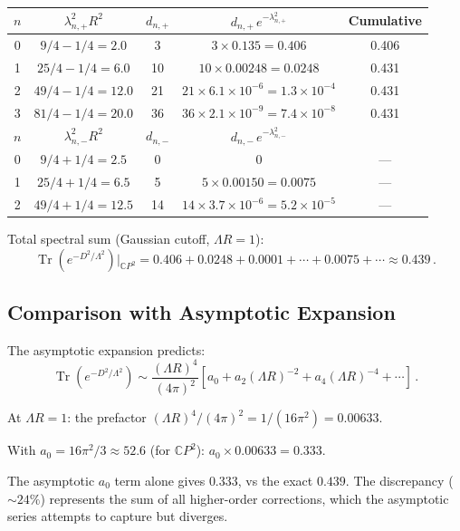 \documentclass[11pt,a4paper]{article}
\newcommand{\Tr}{\operatorname{Tr}}
\newcommand{\CP}{\mathbb{C}P}
\begin{document}
\begin{center}
\begin{longtable}{ccccc}
\toprule
$n$ & $\lambda_{n,+}^2 R^2$ & $d_{n,+}$ & $d_{n,+}\,e^{-\lambda_{n,+}^2}$ & Cumulative \\
\midrule
0 & $9/4 - 1/4 = 2.0$ & 3 & $3 \times 0.135 = 0.406$ & 0.406 \\
1 & $25/4 - 1/4 = 6.0$ & 10 & $10 \times 0.00248 = 0.0248$ & 0.431 \\
2 & $49/4 - 1/4 = 12.0$ & 21 & $21 \times 6.1\times10^{-6} = 1.3\times10^{-4}$ & 0.431 \\
3 & $81/4 - 1/4 = 20.0$ & 36 & $36 \times 2.1\times10^{-9} = 7.4\times10^{-8}$ & 0.431 \\
\midrule
$n$ & $\lambda_{n,-}^2 R^2$ & $d_{n,-}$ & $d_{n,-}\,e^{-\lambda_{n,-}^2}$ & \\
\midrule
0 & $9/4 + 1/4 = 2.5$ & 0 & 0 & --- \\
1 & $25/4 + 1/4 = 6.5$ & 5 & $5 \times 0.00150 = 0.0075$ & --- \\
2 & $49/4 + 1/4 = 12.5$ & 14 & $14 \times 3.7\times10^{-6} = 5.2\times10^{-5}$ & --- \\
\bottomrule
\end{longtable}
\end{center}

Total spectral sum (Gaussian cutoff, $\Lambda R = 1$):
\begin{equation}
\Tr(e^{-D^2/\Lambda^2})\bigg|_{\CP^2} = 0.406 + 0.0248 + 0.0001 + \cdots + 0.0075 + \cdots \approx 0.439\,.
\end{equation}

\subsection{Comparison with Asymptotic Expansion}

The asymptotic expansion predicts:
\begin{equation}
\Tr(e^{-D^2/\Lambda^2}) \sim \frac{(\Lambda R)^4}{(4\pi)^2}\left[a_0 + a_2(\Lambda R)^{-2} + a_4(\Lambda R)^{-4} + \cdots\right]\,.
\end{equation}

At $\Lambda R = 1$: the prefactor $(\Lambda R)^4/(4\pi)^2 = 1/(16\pi^2) = 0.00633$.

With $a_0 = 16\pi^2/3 \approx 52.6$ (for $\CP^2$): $a_0 \times 0.00633 = 0.333$.

The asymptotic $a_0$ term alone gives $0.333$, vs the exact $0.439$. The discrepancy ($\sim 24\%$) represents the sum of all higher-order corrections, which the asymptotic series attempts to capture but diverges.
\end{document}
